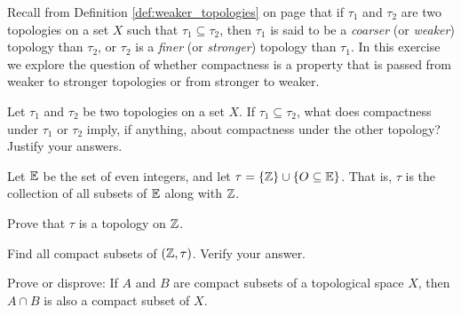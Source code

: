 \item Recall from Definition \ref{def:weaker_topologies} on page \pageref{def:weaker_topologies} that if $\tau_1$ and $\tau_2$ are two topologies on a set $X$ such that $\tau_1 \subseteq \tau_2$, then $\tau_1$ is said to be a \emph{coarser} (or \emph{weaker}) topology than $\tau_2$, or $\tau_2$ is a \emph{finer} (or \emph{stronger}) topology than $\tau_1$. In this exercise we explore the question of whether compactness is a property that is passed from weaker to stronger topologies or from stronger to weaker. 

Let $\tau_1$ and $\tau_2$ be two topologies on a set $X$. If $\tau_1 \subseteq \tau_2$, what does compactness under $\tau_1$ or $\tau_2$ imply, if anything, about compactness under the other topology? Justify your answers.


\begin{comment}

\ExerciseSolution Let $A$ be a subset of $X$ and suppose $A$ is compact in $(X, \tau_2)$. If $\{O_{\alpha}\}_{\alpha \in I}$ is an open cover of $A$ in $(X, \tau_1)$, then $\{O_{\alpha}\}_{\alpha \in I}$ is also an open cover of $A$ in $(X, \tau_2)$. Since $A$ is compact in $(X, \tau_2)$, there is a finite subcover $\{O_{\alpha_k}\}_{1 \leq k \leq n}$ of  $\{O_{\alpha}\}_{\alpha \in I}$. Thus, $A$ is also compact in $(X, \tau_1)$. 

However, if $A$ is compact in $(X, \tau_1)$, it does not follow that $A$ is compact in $(X,\tau_2)$. For example, consider $X = \R$ with $\tau_1$ the Euclidean metric topology and $\tau_2$ the discrete topology. We know that $[0,1]$ is compact in $(X, \tau_1)$, but the open cover $\{n\}_{n \in [0,1]}$ for $[0,1]$ in $(X, \tau_2)$ has no finite subcover. 


\end{comment}

\item \label{ex:intersection_not_compact} Let $\mathbb{E}$ be the set of even integers, and let $\tau = \{\mathbb{Z}\} \cup \{O \subseteq \mathbb{E}\}$. That is, $\tau$ is the collection of all subsets of $\mathbb{E}$ along with $\mathbb{Z}$. 
\ba
\item Prove that $\tau$ is a topology on $\mathbb{Z}$.

\item Find all compact subsets of $(\mathbb{Z}, \tau)$. Verify your answer.

\item Prove or disprove: If $A$ and $B$ are compact subsets of a topological space $X$, then $A \cap B$ is also a compact subset of $X$.

